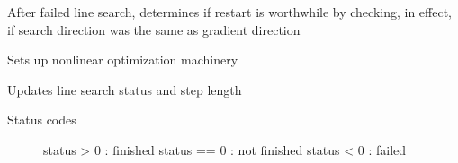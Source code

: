 \documentclass[letterpaper,10pt,english]{sphinxmanual}
\begin{document}
\begin{fulllineitems}
\begin{fulllineitems}
After failed line search, determines if restart is worthwhile by
checking, in effect, if search direction was the same as gradient
direction

\end{fulllineitems}


\begin{fulllineitems}
\label{\detokenize{ref/seisflows.optimize:seisflows.optimize.base.base.save}}
\end{fulllineitems}


\begin{fulllineitems}
\label{\detokenize{ref/seisflows.optimize:seisflows.optimize.base.base.savetxt}}
\end{fulllineitems}


\begin{fulllineitems}
\label{\detokenize{ref/seisflows.optimize:seisflows.optimize.base.base.setup}}
Sets up nonlinear optimization machinery

\end{fulllineitems}


\begin{fulllineitems}
\label{\detokenize{ref/seisflows.optimize:seisflows.optimize.base.base.update_search}}
Updates line search status and step length
\begin{description}
\item[{Status codes}] \leavevmode
status \textgreater{} 0  : finished
status == 0 : not finished
status \textless{} 0  : failed

\end{description}

\end{fulllineitems}


\end{fulllineitems}
\end{document}
